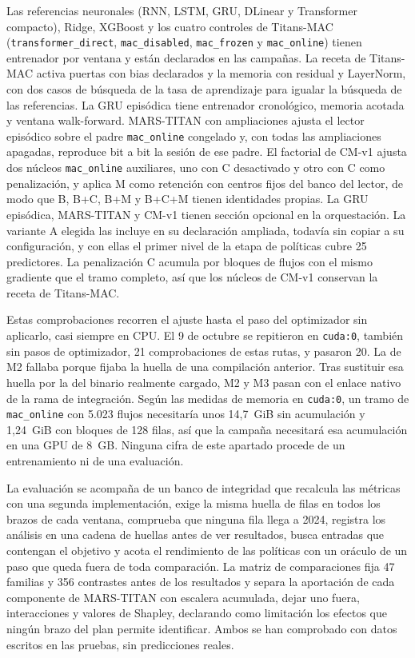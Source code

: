 \documentclass[11pt,a4paper]{report}
\begin{document}
Las referencias neuronales (RNN, LSTM, GRU, DLinear y Transformer compacto),
Ridge, XGBoost y los cuatro controles de Titans-MAC
(\texttt{transformer\_direct}, \texttt{mac\_disabled}, \texttt{mac\_frozen} y
\texttt{mac\_online}) tienen entrenador por ventana y están declarados en las
campañas. La receta de Titans-MAC activa puertas con bias declarados y la
memoria con residual y LayerNorm, con dos casos de búsqueda de la tasa de
aprendizaje para igualar la búsqueda de las referencias. La GRU episódica tiene
entrenador cronológico, memoria acotada y ventana walk-forward. MARS-TITAN con
ampliaciones ajusta el lector episódico sobre el padre \texttt{mac\_online}
congelado y, con todas las ampliaciones apagadas, reproduce bit a bit la sesión
de ese padre. El factorial de CM-v1 ajusta dos núcleos \texttt{mac\_online}
auxiliares, uno con C desactivado y otro con C como penalización, y aplica M
como retención con centros fijos del banco del lector, de modo que B, B+C, B+M
y B+C+M tienen identidades propias. La GRU episódica, MARS-TITAN y CM-v1
tienen sección opcional en la orquestación. La variante A elegida las incluye
en su declaración ampliada, todavía sin copiar a su configuración, y con ellas
el primer nivel de la etapa de políticas cubre 25 predictores. La penalización
C acumula por bloques de flujos con el mismo gradiente que el tramo completo,
así que los núcleos de CM-v1 conservan la receta de Titans-MAC.

Estas comprobaciones recorren el ajuste hasta el paso del optimizador sin
aplicarlo, casi siempre en CPU. El 9 de octubre se repitieron en
\texttt{cuda:0}, también sin pasos de optimizador, 21 comprobaciones de estas
rutas, y pasaron 20. La de M2 fallaba porque fijaba la huella de una
compilación anterior. Tras sustituir esa huella por la del binario realmente
cargado, M2 y M3 pasan con el enlace nativo de la rama de integración. Según
las medidas de memoria en \texttt{cuda:0}, un tramo de
\texttt{mac\_online} con 5.023 flujos necesitaría unos 14,7~GiB sin acumulación
y 1,24~GiB con bloques de 128 filas, así que la campaña necesitará esa
acumulación en una GPU de 8~GB. Ninguna cifra de este apartado procede de un
entrenamiento ni de una evaluación.

La evaluación se acompaña de un banco de integridad que recalcula las métricas
con una segunda implementación, exige la misma huella de filas en todos los
brazos de cada ventana, comprueba que ninguna fila llega a 2024, registra los
análisis en una cadena de huellas antes de ver resultados, busca entradas que
contengan el objetivo y acota el rendimiento de las políticas con un oráculo de
un paso que queda fuera de toda comparación. La matriz de comparaciones fija
47 familias y 356 contrastes antes de los resultados y separa la aportación de
cada componente de MARS-TITAN con escalera acumulada, dejar uno fuera,
interacciones y valores de Shapley, declarando como limitación los efectos que
ningún brazo del plan permite identificar. Ambos se han comprobado con datos
escritos en las pruebas, sin predicciones reales.
\end{document}
